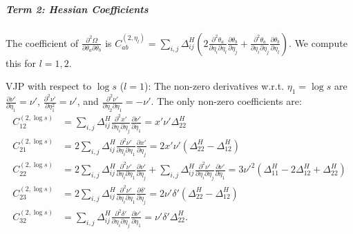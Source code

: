 \documentclass{article}
\begin{document}
\subparagraph{Term 2: Hessian Coefficients}

The coefficient of $\frac{\partial^2 \Omega}{\partial \theta_a \partial \theta_b}$ is $C^{(2,\eta_l)}_{ab} = \sum_{i,j} \Delta^H_{ij} ( 2 \frac{\partial^2 \theta_a}{\partial \eta_i \partial \eta_l} \frac{\partial \theta_b}{\partial \eta_j} + \frac{\partial^2 \theta_a}{\partial \eta_i \partial \eta_j} \frac{\partial \theta_b}{\partial \eta_l} )$.
We compute this for $l=1,2$.

VJP with respect to $\log s$ ($l=1$):
The non-zero derivatives w.r.t. $\eta_1 = \log s$ are $\frac{\partial\nu'}{\partial\eta_1}=\nu'$, $\frac{\partial^2\nu'}{\partial\eta_1^2}=\nu'$, and $\frac{\partial^2\nu'}{\partial\eta_2\partial\eta_1}=-\nu'$.
The only non-zero coefficients are:
%
\begin{align}
  C^{(2,\log s)}_{12} & = \sum_{i,j} \Delta^H_{ij} \frac{\partial^2 x'}{\partial\eta_i\partial\eta_j} \frac{\partial \nu'}{\partial\eta_1} = x'\nu' \Delta^H_{22}                                                                                                                                                     \\
  C^{(2,\log s)}_{21} & = 2 \sum_{i,j} \Delta^H_{ij} \frac{\partial^2 \nu'}{\partial\eta_i\partial\eta_1} \frac{\partial x'}{\partial\eta_j} = 2x'\nu'(\Delta^H_{22} - \Delta^H_{12})                                                                                                                                 \\
  C^{(2,\log s)}_{22} & = 2 \sum_{i,j} \Delta^H_{ij} \frac{\partial^2\nu'}{\partial\eta_i\partial\eta_1} \frac{\partial\nu'}{\partial\eta_j} + \sum_{i,j} \Delta^H_{ij} \frac{\partial^2\nu'}{\partial\eta_i\partial\eta_j} \frac{\partial\nu'}{\partial\eta_1} = 3\nu'^2(\Delta^H_{11}-2\Delta^H_{12}+\Delta^H_{22}) \\
  C^{(2,\log s)}_{23} & = 2 \sum_{i,j} \Delta^H_{ij} \frac{\partial^2\nu'}{\partial\eta_i\partial\eta_1} \frac{\partial\delta'}{\partial\eta_j} = 2\nu'\delta'(\Delta^H_{22} - \Delta^H_{12})                                                                                                                         \\
  C^{(2,\log s)}_{32} & = \sum_{i,j} \Delta^H_{ij} \frac{\partial^2 \delta'}{\partial\eta_i\partial\eta_j} \frac{\partial \nu'}{\partial\eta_1} = \nu'\delta' \Delta^H_{22}.
\end{align}
\end{document}
